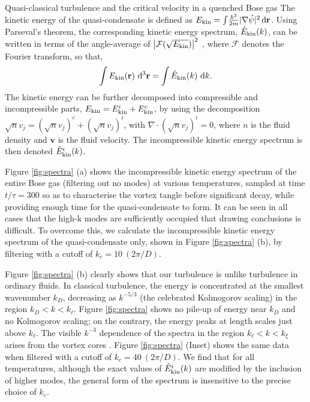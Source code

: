 \begin{chapter}{\label{cha:nonequib}Quasi-classical turbulence and the critical velocity in a quenched Bose gas}
The kinetic energy of the quasi-condensate is defined as $E_{\rm kin} = \int\!\frac{\hbar^2}{2m}|\nabla\hat\psi|^2\,\mathrm{d}\mathbf{r}$. Using Parseval's theorem, the corresponding kinetic energy spectrum, $\hat{E}_{\rm kin}(k)$, can be written in terms of the angle-average of $\left |\mathcal{F}(\sqrt{E_{\rm kin}})\right |^2$ \cite{Nore},
where $\mathcal{F}$ denotes the Fourier transform, so that,
\begin{equation}
  \int E_{\rm kin}({\bf r})~{\rm d}^3{\bf r} = \int \hat{E}_{\rm kin}(k)~{\mathrm d}k.
  \label{eq:Ekin}
\end{equation}
The kinetic energy can be further decomposed into compressible and incompressible parts, $E_{\rm kin} = E^i_{\rm kin} + E^c_{\rm kin}$, by using the decomposition \cite{Nore} $\sqrt{n}v_j = (\sqrt{n}v_j)^c + (\sqrt{n}v_j)^i$, with $\nabla\cdot(\sqrt{n}v_j)^i=0$, where $n$ is the fluid density and $\mathbf{v}$ is the fluid velocity. The incompressible kinetic energy spectrum is then denoted $\hat{E}^i_{\rm kin}(k)$.

Figure \ref{fig:spectra} (a) shows the incompressible kinetic energy spectrum of the entire Bose gas (filtering out no modes) at various temperatures, sampled at time $t/\tau=300$ so as to characterise the vortex tangle before significant decay, while providing enough time for the quasi-condensate to form. It can be seen in all cases that the high-k modes are sufficiently occupied that drawing conclusions is difficult. To overcome this, we calculate the incompressible kinetic energy spectrum of the quasi-condensate only, shown in Figure \ref{fig:spectra} (b), by filtering with a cutoff of $k_c=10~(2\pi/D)$.

Figure \ref{fig:spectra} (b) clearly shows that our turbulence is unlike turbulence in ordinary fluids.
In classical turbulence, the energy is concentrated
at the smallest wavenumber $k_D$, decreasing as $k^{-5/3}$ (the celebrated
Kolmogorov scaling) in the region $k_D < k < k_{\ell}$. Figure \ref{fig:spectra}
shows no pile-up of energy near $k_D$ and no Kolmogorov
scaling; on the contrary, the energy peaks at length
scales just above $k_{\ell}$.  The visible $k^{-3}$ dependence of the spectra
in the region $k_\ell<k<k_\xi$ arises from the vortex cores 
\cite{Nore}. Figure \ref{fig:spectra} (Inset) shows the same data when filtered with a cutoff of $k_c=40~(2\pi/D)$. We find that for all temperatures, although the exact values of $\hat{E}^i_{\rm kin}(k)$ are modified by the inclusion of higher modes, the general form of the spectrum is insensitive to the precise choice of $k_c$.


\end{chapter}
